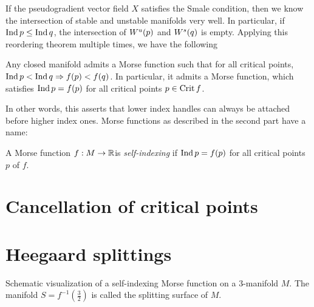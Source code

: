 If the pseudogradient vector field $X$ satisfies the Smale condition, then we know the intersection of stable and unstable manifolds very well.
In particular, if $\operatorname{Ind} p \le  \operatorname{Ind} q$, the intersection of $W^u(p)$ and  $W^s(q)$ is empty.
Applying this reordering theorem multiple times, we have the following

\begin{theorem}
    Any closed manifold admits a Morse function such that for all critical points, $\operatorname{Ind} p < \operatorname{Ind} q \Rightarrow f(p) < f(q)$.
    In particular, it admits a Morse function, which satisfies $ \operatorname{Ind} p  = f(p) $ for all critical points $p \in \operatorname{Crit} f$.
\end{theorem}
In other words, this asserts that lower index handles can always be attached before higher index ones.
Morse functions as described in the second part have a name:

\begin{definition}
    A Morse function $f: M \to  \mathbb{R}$is \emph{self-indexing} if $\operatorname{Ind} p = f(p)$ for all critical points  $p$ of  $f$.
\end{definition}


\section{Cancellation of critical points}


\section{Heegaard splittings}

\begin{marginfigure}
    \centering
    \caption{Schematic visualization of a self-indexing Morse function on a $3$-manifold $M$.
        The manifold $S = f^{-1}(\frac{3}{2})$ is called the splitting surface of $M$.
    }
    \label{fig:heegaard-splittings-schemattically}
\end{marginfigure}

